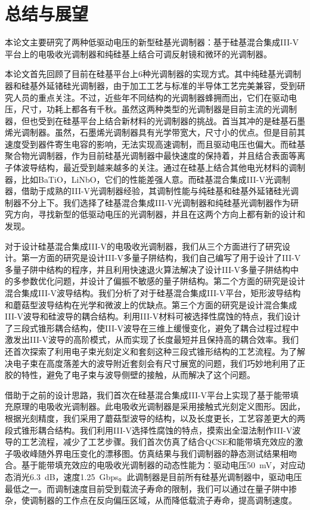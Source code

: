\chapter{总结与展望}
本论文主要研究了两种低驱动电压的新型硅基光调制器：基于硅基混合集成III-V平台上的电吸收光调制器和纯硅基上结合可调反射镜和微环的光调制器。

本论文首先回顾了目前在硅基平台上6种光调制器的实现方式。其中纯硅基光调制器和硅基外延锗硅光调制器，由于加工工艺与标准的半导体工艺完美兼容，受到研究人员的重点关注。不过，近些年不同结构的光调制器蜂拥而出，它们在驱动电压，尺寸，功耗上都各有千秋。虽然这两种类型的光调制器是目前主流的光调制器，但也受到在硅基平台上结合新材料的光调制器的挑战。首当其冲的是硅基石墨烯光调制器。虽然，石墨烯光调制器具有光学带宽大，尺寸小的优点。但是目前其速度受到器件寄生电容的影响，无法实现高速调制，而且驱动电压也偏大。而硅基聚合物光调制器，作为目前硅基光调制器中最快速度的保持着，并且结合表面等离子体波导结构，最近受到越来越多的关注。通过在硅基上结合其他电光材料的调制器，比如BaTiO，LiNbO，它们的性能差强人意。而硅基混合集成III-V光调制器，借助于成熟的III-V光调制器经验，其调制性能与纯硅基和硅基外延锗硅光调制器不分上下。我们选择了硅基混合集成III-V光调制器和纯硅基光调制器作为研究方向，寻找新型的低驱动电压的光调制器，并且在这两个方向上都有新的设计和发现。

对于设计硅基混合集成III-V的电吸收光调制器，我们从三个方面进行了研究设计。第一方面的研究是设计III-V多量子阱结构，我们自己编写了用于设计了III-V多量子阱中结构的程序，并且利用快速退火算法解决了设计III-V多量子阱结构中的多参数优化问题，并设计了偏振不敏感的量子阱结构。第二个方面的研究是设计混合集成III-V波导结构。我们分析了对于硅基混合集成III-V平台，矩形波导结构和蘑菇型波导结构在光学和微波上的优缺点。第三个方面的研究是设计混合集成III-V波导和硅波导的耦合结构。利用III-V材料可被选择性腐蚀的特点，我们设计了三段式锥形耦合结构，使III-V波导在三维上缓慢变化，避免了耦合过程过程中激发出III-V波导的高阶模式，从而实现了长度最短并且保持高的耦合效率。我们还首次探索了利用电子束光刻定义和套刻这种三段式锥形结构的工艺流程。为了解决电子束在高度落差大的波导附近套刻会有尺寸展宽的问题，我们巧妙地利用了正胶的特性，避免了电子束与波导侧壁的接触，从而解决了这个问题。

借助于之前的设计思路，我们首次在硅基混合集成III-V平台上实现了基于能带填充原理的电吸收光调制器。此电吸收光调制器是采用接触式光刻定义图形。因此，根据光刻精度，我们采用了蘑菇型波导的结构，以及长度更长，工艺容差更大的两段式锥形耦合结构。我们利用III-V选择性腐蚀的特点，摸索出全湿法制作III-V波导的工艺流程，减少了工艺步骤。我们首次仿真了结合QCSE和能带填充效应的激子吸收峰随外界电压变化的漂移图。仿真结果与我们调制器的静态测试结果相吻合。基于能带填充效应的电吸收光调制器的动态性能为：驱动电压50~mV，对应动态消光6.3~dB，速度1.25~Gbps。此调制器是目前所有硅基光调制器中，驱动电压最低之一。而调制速度目前受到载流子寿命的限制，我们可以通过在量子阱中掺杂，使调制器的工作点在反向偏压区域，从而降低载流子寿命，提高调制速度。

